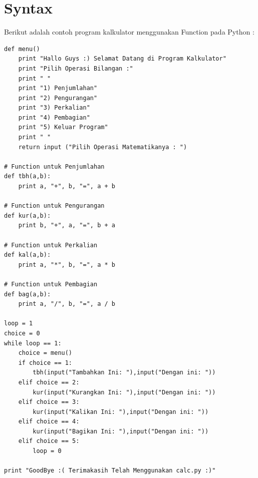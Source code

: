 \section{Syntax} 
Berikut adalah contoh program kalkulator menggunakan Function pada Python : 
\begin{verbatim}
def menu()
    print "Hallo Guys :) Selamat Datang di Program Kalkulator"
    print "Pilih Operasi Bilangan :"
    print " "
    print "1) Penjumlahan"
    print "2) Pengurangan"
    print "3) Perkalian"
    print "4) Pembagian"
    print "5) Keluar Program"
    print " "
    return input ("Pilih Operasi Matematikanya : ")

# Function untuk Penjumlahan
def tbh(a,b):
    print a, "+", b, "=", a + b

# Function untuk Pengurangan
def kur(a,b):
    print b, "+", a, "=", b + a

# Function untuk Perkalian
def kal(a,b):
    print a, "*", b, "=", a * b

# Function untuk Pembagian
def bag(a,b):
    print a, "/", b, "=", a / b

loop = 1
choice = 0
while loop == 1:
    choice = menu()
    if choice == 1:
        tbh(input("Tambahkan Ini: "),input("Dengan ini: "))
    elif choice == 2:
        kur(input("Kurangkan Ini: "),input("Dengan ini: "))
    elif choice == 3:
        kur(input("Kalikan Ini: "),input("Dengan ini: "))
    elif choice == 4:
        kur(input("Bagikan Ini: "),input("Dengan ini: "))
    elif choice == 5:
        loop = 0

print "GoodBye :( Terimakasih Telah Menggunakan calc.py :)"
\end{verbatim}

